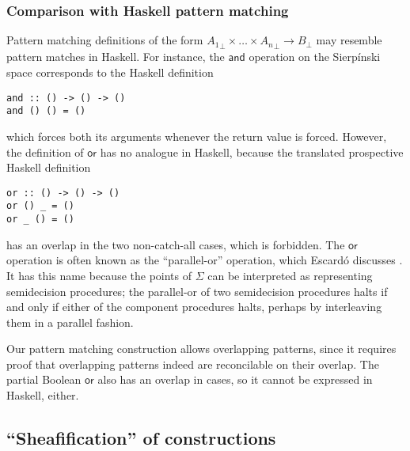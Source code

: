 \documentclass[conference]{IEEEtran}
\begin{document}
\subsubsection{Comparison with Haskell pattern matching}

Pattern matching definitions of the form ${A_1}_\bot \times \ldots \times {A_n}_\bot \to B_\bot$ may resemble pattern matches in Haskell. For instance, the $\mathsf{and}$ operation on the Sierp\'inski space corresponds to the Haskell definition
\begin{verbatim}
and :: () -> () -> ()
and () () = ()
\end{verbatim}
which forces both its arguments whenever the return value is forced. However, the definition of $\mathsf{or}$ has no analogue in Haskell, because the translated prospective Haskell definition
\begin{verbatim}
or :: () -> () -> ()
or () _ = ()
or _ () = ()
\end{verbatim}
has an overlap in the two non-catch-all cases, which is forbidden.
The $\mathsf{or}$ operation is often known as the ``parallel-or'' operation, which Escard\'o discusses \cite{escardo2004}. It has this name because the points of $\Sigma$ can be interpreted as representing semidecision procedures; the parallel-or of two semidecision procedures halts if and only if either of the component procedures halts, perhaps by interleaving them in a parallel fashion.

Our pattern matching construction allows overlapping patterns, since it requires proof that overlapping patterns indeed are reconcilable on their overlap. The partial Boolean $\mathsf{or}$ also has an overlap  in cases, so it cannot be expressed in Haskell, either.

\subsection{``Sheafification'' of constructions}
\label{s:ex:sheaf}
\end{document}
